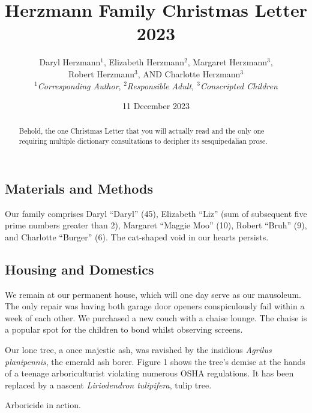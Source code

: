 \documentclass[letterpaper,11pt]{article}
\title{\vspace{-2.0cm}Herzmann Family Christmas Letter 2023}
\author{Daryl Herzmann${}^1$, Elizabeth Herzmann${}^2$, Margaret 
Herzmann${}^3$,\\
Robert Herzmann${}^3$, AND Charlotte Herzmann${}^3$ \\
\textit{${}^1$Corresponding Author},
\it{${}^2$Responsible Adult},
\it{${}^3$Conscripted Children}}
\date{11 December 2023}
\makeatletter
\newenvironment{figurehere}
  {\def\@captype{figure}}
  {}
\makeatother
\begin{document}
\maketitle
\vspace{-0.75cm}
\begin{abstract}
Behold, the one Christmas Letter that you will actually read and the only one
requiring multiple dictionary consultations to decipher its sesquipedalian prose. 
\end{abstract}

\vspace{-0.5cm}

\noindent\makebox[\linewidth]{\rule{\textwidth}{1pt}}

\begin{multicols}{2}

\section{Materials and Methods} 

Our family comprises Daryl
\enquote{Daryl} (45), Elizabeth \enquote{Liz} (sum of subsequent five prime numbers
greater than 2),
Margaret \enquote{Maggie Moo} (10), Robert \enquote{Bruh} (9), and
Charlotte \enquote{Burger} (6). The cat-shaped void in our hearts persists.

\subsection{Housing and Domestics}

We remain at our permanent house, which will one day serve as our mausoleum.
The only repair was having
both garage door openers conspiculously fail within a week of each other.
We purchased a new couch with a chaise lounge. The chaise is a popular spot for the
children to bond whilst observing screens.

Our lone tree, a once majestic ash, was ravished by the insidious
\emph{Agrilus planipennis}, the emerald ash borer. Figure 1 shows the tree's
demise at the hands of a teenage arboriculturist violating numerous OSHA
regulations.  It has been replaced by a nascent \textit{Liriodendron tulipifera}, tulip tree.
\bigskip

\begin{figurehere}
    \centering   
    \caption{Arboricide in action.}
\end{figurehere}



\end{multicols}
\end{document}
